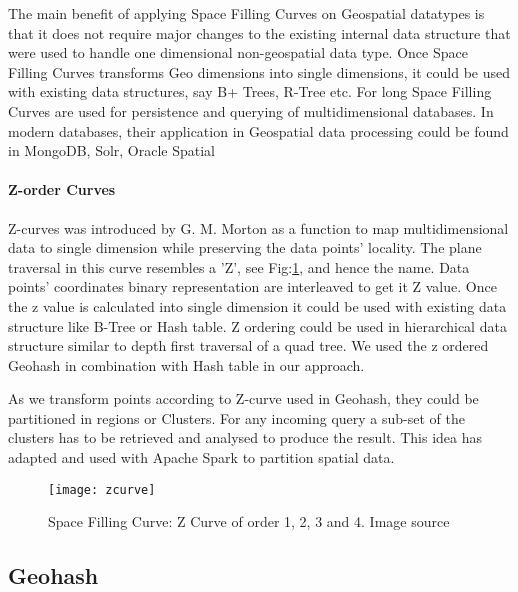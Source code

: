 \documentclass[article,type=msc,colorback,12pt,accentcolor=tud1d]{tudthesis}
\begin{document}
		  The main benefit of applying Space Filling Curves on Geospatial datatypes is that it does not require major changes to the existing internal data structure that were used to handle one dimensional non-geospatial data type. Once Space Filling Curves transforms Geo dimensions into single dimensions, it could be used with existing data structures, say B+ Trees, R-Tree etc\cite{Asano1995}. For long Space Filling Curves are used for persistence and querying of multidimensional databases\cite{Lawder:2000:USC:646102.681186}. In modern databases, their application in Geospatial data processing could be found in MongoDB\cite{MongoDB}, Solr\cite{apachesolr}, Oracle Spatial\cite{oraclespatial} 
		  
		  \clearpage
		  \paragraph{Z-order Curves}
		  Z-curves was introduced by G. M. Morton as a function to map multidimensional data to single dimension while preserving the data points' locality. The plane traversal in this curve resembles a 'Z', see Fig:\ref{fig:zcurve},  and hence the name. Data points' coordinates binary representation are interleaved to get it Z value. Once the z value is calculated into single dimension it could be used with existing data structure like B-Tree or Hash table. Z ordering could be used in hierarchical data structure similar to depth first traversal of a quad tree\cite{wiki:Zcurves}. We used the z ordered Geohash in combination with Hash table in our approach. 
		  
		  As we transform points according to Z-curve used in Geohash, they could be partitioned in regions or Clusters. For any incoming query a sub-set of the clusters has to be retrieved and analysed to produce the result. This idea has adapted and used with Apache Spark to partition spatial data.
		  
		  	\begin{figure}[h]
		  		\centering
		  		\texttt{[image: zcurve]}
		  		\caption{Space Filling Curve: Z Curve of order 1, 2, 3 and 4. Image source \cite{wiki:Zcurves} }
		  		\label{fig:zcurve}
		  	\end{figure}
		  
		  
		  \clearpage
		   \subsection{Geohash}
		   
\end{document}
